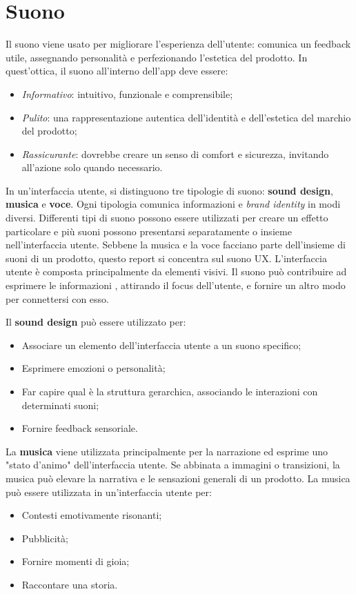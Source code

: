 \documentclass[12pt, a4paper]{report}
\begin{document}
   \section{Suono}
   	    Il suono viene usato per migliorare l'esperienza dell'utente: comunica un feedback utile, assegnando personalità e
   	    perfezionando l’estetica del prodotto. In quest’ottica, il suono all’interno dell’app deve essere:
   	    \begin{itemize}
   		    \item \textit{Informativo}: intuitivo, funzionale e comprensibile;
   		    \item \textit{Pulito}: una rappresentazione autentica dell'identità e dell'estetica del marchio del prodotto;
   		    \item \textit{Rassicurante}: dovrebbe creare un senso di comfort e sicurezza, invitando all'azione solo quando necessario.
   	    \end{itemize}
   	    In un'interfaccia utente, si distinguono tre tipologie di suono: \textbf{sound design}, \textbf{musica} e \textbf{voce}. Ogni tipologia comunica informazioni e \textit{brand identity} in modi diversi.
   	    Differenti tipi di suono possono essere utilizzati per creare	un effetto 	particolare e più suoni possono presentarsi separatamente o insieme nell’interfaccia utente. Sebbene la musica e la voce
   	    facciano parte dell’insieme di suoni di un prodotto, questo report si concentra sul suono UX. L'interfaccia utente è composta principalmente da elementi visivi. Il suono può contribuire ad esprimere le informazioni
   	    , attirando il focus dell’utente, e fornire un altro modo per connettersi con esso.


   	    Il \textbf{sound design} può essere utilizzato per:
    	\begin{itemize}
    		\item Associare un elemento dell'interfaccia utente a un suono specifico;
    		\item Esprimere emozioni o personalità;
    		\item Far capire qual è la struttura gerarchica, associando le interazioni con determinati suoni;
    		\item Fornire feedback sensoriale.
    	\end{itemize}


        La \textbf{musica} viene utilizzata principalmente per la narrazione ed esprime uno "stato d'animo" dell'interfaccia utente.
        Se abbinata a immagini o transizioni, la musica può elevare la narrativa e le sensazioni generali di un prodotto.
        La musica può essere utilizzata in un'interfaccia utente per:
        \begin{itemize}
    	    \item Contesti emotivamente risonanti;
    	    \item Pubblicità;
    	    \item Fornire momenti di gioia;
    	    \item Raccontare una storia.
        \end{itemize}
\end{document}
